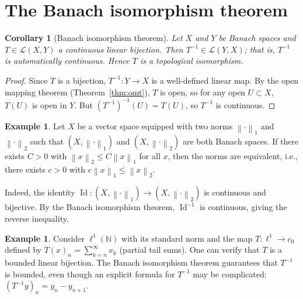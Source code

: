 \documentclass[a4paper,12pt]{book}
\DeclareMathOperator{\Id}{Id}
\newcommand{\N}{\mathbb{N}}
\newcommand{\norm}[1]{\left\| #1 \right\|}
\theoremstyle{definition}
\newtheorem{example}[definition]{Example}
\theoremstyle{plain}
\newtheorem{corollary}[definition]{Corollary}
\theoremstyle{remark}
\begin{document}
\section{The Banach isomorphism theorem}\label{sec:banach-iso}

\begin{corollary}[Banach isomorphism theorem]\label{cor:banach-iso}
Let $X$ and $Y$ be Banach spaces and $T \in \mathcal{L}(X,Y)$ a continuous
linear bijection. Then $T^{-1} \in \mathcal{L}(Y,X)$; that is, $T^{-1}$ is
automatically continuous. Hence $T$ is a topological isomorphism.
\end{corollary}

\begin{proof}
Since $T$ is a bijection, $T^{-1} \colon Y \to X$ is a well-defined linear map.
By the open mapping theorem (Theorem~\ref{thm:omt}), $T$ is open, so for any
open $U \subset X$, $T(U)$ is open in $Y$. But $(T^{-1})^{-1}(U) = T(U)$, so
$T^{-1}$ is continuous.
\end{proof}

\begin{example}\label{ex:equivalent-norms-banach}
Let $X$ be a vector space equipped with two norms $\norm{\cdot}_1$ and
$\norm{\cdot}_2$ such that $(X, \norm{\cdot}_1)$ and $(X, \norm{\cdot}_2)$ are
both Banach spaces. If there exists $C > 0$ with $\norm{x}_2 \leq C\norm{x}_1$
for all $x$, then the norms are equivalent, i.e., there exists $c > 0$ with
$c\norm{x}_1 \leq \norm{x}_2$.

Indeed, the identity $\Id \colon (X, \norm{\cdot}_1) \to (X, \norm{\cdot}_2)$ is
continuous and bijective. By the Banach isomorphism theorem, $\Id^{-1}$ is
continuous, giving the reverse inequality.
\end{example}

\begin{example}\label{ex:banach-iso-ell1}
Consider $\ell^1(\N)$ with its standard norm and the map $T \colon \ell^1 \to c_0$
defined by $T(x)_n = \sum_{k=n}^{\infty} x_k$ (partial tail sums). One can verify
that $T$ is a bounded linear bijection. The Banach isomorphism theorem guarantees
that $T^{-1}$ is bounded, even though an explicit formula for $T^{-1}$ may be
complicated: $(T^{-1}y)_n = y_n - y_{n+1}$.
\end{example}
\end{document}
